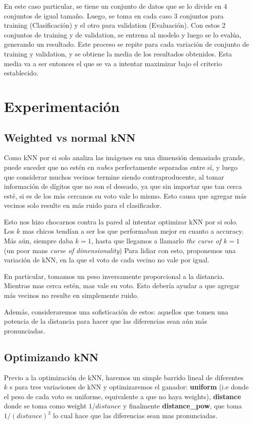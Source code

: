 \documentclass[a4paper]{article}
\begin{document}
    En este caso particular, se tiene un conjunto de datos que se lo divide en 4 conjuntos de igual tamaño. Luego, se toma en cada caso 3 conjuntos para training (Clasificación) y el otro para validation (Evaluación). Con estos 2 conjuntos de training y de validation, se entrena al modelo y luego se lo evalúa, generando un resultado. Este proceso se repite para cada variación de conjunto de training y validation, y se obtiene la media de los resultados obtenidos. Esta media va a ser entonces el que se va a intentar maximizar bajo el criterio establecido.
        
\section{Experimentación}

    \subsection{Weighted vs normal kNN}\label{exp-knn-weights}
    Como kNN por si solo analiza las imágenes en una dimensión demasiado grande, puede suceder que no estén en \textit{nubes} perfectamente separadas entre sí, y luego que considerar muchos vecinos termine siendo contraproducente, al tomar información de dígitos que no son el deseado, ya que sin importar que tan cerca esté, si es de los más cercanos su voto vale lo mismo. Esto causa que agregar más vecinos solo resulte en más ruido para el clasificador.
    
    Esto nos hizo chocarnos contra la pared al intentar optimizar kNN por si solo. Los $k$ mas chicos tendían a ser los que performaban mejor en cuanto a accuracy. Más aún, siempre daba $k=1$, hasta que llegamos a llamarlo \textit{the curse of $k=1$} (un poor mans \textit{curse of dimensionality}) Para lidiar con esto, proponemos una variación de kNN, en la que el voto de cada vecino no vale por igual.
    
    En particular, tomamos un peso inversamente proporcional a la distancia. Mientras mas cerca estén, mas vale su voto. Esto debería ayudar a que agregar más vecinos no resulte en simplemente ruido.
    
    Además, consideraremos una sofisticación de estos: aquellos que tomen una potencia de la distancia para hacer que las diferencias sean aún más pronunciadas.

    \subsection{Optimizando kNN}\label{exp-knn-opt}
    Previo a la optimización de kNN, haremos un simple barrido lineal de diferentes $k$ s para tres variaciones de kNN y optimizaremos el ganador: \textbf{uniform} (i.e donde el peso de cada voto es uniforme, equivalente a que no haya weights), \textbf{distance} donde se toma como weight $1/distance$ y finalmente \textbf{distance\_pow}, que toma $1/(distance)^3$ lo cual hace que las diferencias sean mas pronunciadas.
    
\end{document}
